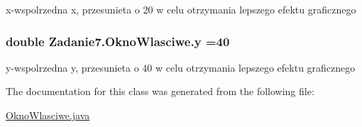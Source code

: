 x-\/wspolrzedna x, przesunieta o 20 w celu otrzymania lepszego efektu graficznego 

\subsubsection[{\texorpdfstring{y}{y}}]{\setlength{\rightskip}{0pt plus 5cm}double Zadanie7.\+Okno\+Wlasciwe.\+y =40\hspace{0.3cm}{\ttfamily [private]}}\hypertarget{class_zadanie7_1_1_okno_wlasciwe_a59d4e6fb76e7711fb07bfcb0df74d9e6}{}\label{class_zadanie7_1_1_okno_wlasciwe_a59d4e6fb76e7711fb07bfcb0df74d9e6}


y-\/wspolrzedna y, przesunieta o 40 w celu otrzymania lepszego efektu graficznego 



The documentation for this class was generated from the following file\+:\begin{DoxyCompactItemize}
\item 
\hyperlink{_okno_wlasciwe_8java}{Okno\+Wlasciwe.\+java}\end{DoxyCompactItemize}
